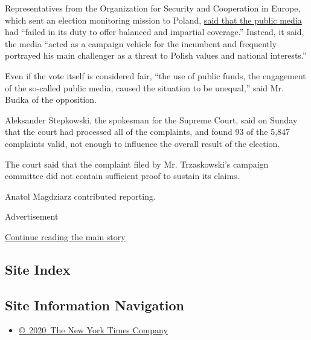 Representatives from the Organization for Security and Cooperation in
Europe, which sent an election monitoring mission to Poland,
\href{https://www.osce.org/files/f/documents/4/9/455728.pdf}{said that
the public media} had ``failed in its duty to offer balanced and
impartial coverage.'' Instead, it said, the media ``acted as a campaign
vehicle for the incumbent and frequently portrayed his main challenger
as a threat to Polish values and national interests.''

Even if the vote itself is considered fair, ``the use of public funds,
the engagement of the so-called public media, caused the situation to be
unequal,'' said Mr. Budka of the opposition.

Aleksander Stepkowski, the spokesman for the Supreme Court, said on
Sunday that the court had processed all of the complaints, and found 93
of the 5,847 complaints valid, not enough to influence the overall
result of the election.

The court said that the complaint filed by Mr. Trzaskowski's campaign
committee did not contain sufficient proof to sustain its claims.

Anatol Magdziarz contributed reporting.

Advertisement

\protect\hyperlink{after-bottom}{Continue reading the main story}

\hypertarget{site-index}{%
\subsection{Site Index}\label{site-index}}

\hypertarget{site-information-navigation}{%
\subsection{Site Information
Navigation}\label{site-information-navigation}}

\begin{itemize}
\tightlist
\item
  \href{https://help.nytimes3xbfgragh.onion/hc/en-us/articles/115014792127-Copyright-notice}{©~2020~The
  New York Times Company}
\end{itemize}

